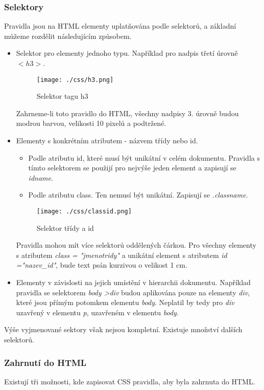 \documentclass[main.tex]{subfiles}
\begin{document}
\subsubsection*{Selektory}
Pravidla jsou na HTML elementy uplatňována podle selektorů, a základní můžeme rozdělit následujícím způsobem.
\begin{itemize}
	\item Selektor pro elementy jednoho typu. Například pro nadpis třetí úrovně  $<h3>$.
		\begin{figure}[h]
			\centering
			\texttt{[image: ./css/h3.png]}
			\caption{Selektor tagu h3}
		\end{figure}
		Zahrneme-li toto pravidlo do HTML, všechny nadpisy 3. úrovně budou modrou barvou, velikosti 10 pixelů a podtržené.
	\item Elementy s konkrétním atributem - názvem třídy nebo id.
		\begin{itemize}
			\item Podle atributu id, které musí být unikátní v celém dokumentu. Pravidla s tímto selektorem se použijí pro nejvýše jeden element a zapisují se \textit{idname}. %
			\item Podle atributu class. Ten nemusí být unikátní. Zapisují se \textit{.classname}.
		\end{itemize}


		\begin{figure}[h]
			\centering
			\texttt{[image: ./css/classid.png]}
			\caption{Selektor třídy a id}
		\end{figure}
		Pravidla mohou mít více selektorů oddělených čárkou. Pro všechny elementy s atributem \textit{class = "jmenotridy"} a unikátní element s atributem \textit{id ="nazev\_id"}, bude text psán kurzivou o velikost 1 cm.
	\item Elementy v závislosti na jejich umístění v hierarchii dokumentu. Například pravidla se selektorem \textit{body \textgreater div} budou aplikována pouze na elementy \textit{div}, které jsou přímým potomkem elementu \textit{body}. Neplatil by tedy pro \textit{div} uzavřený v elementu \textit{p}, uzavřeném v elementu \textit{body}.
\end{itemize}
Výše vyjmenované sektory však nejsou kompletní. Existuje množství dalších selektorů. \cite{web:cz:selektory}

\subsubsection*{Zahrnutí do HTML}
Existují tři možnosti, kde zapisovat CSS pravidla, aby byla zahrnuta do HTML.
\end{document}
